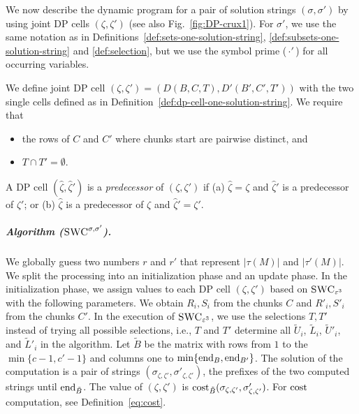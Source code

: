 We now describe the dynamic program for a pair of solution strings $(\sigma, \sigma')$ by using joint DP cells $(\zeta,\zeta')$ (see also Fig.~\ref{fig:DP-crux1}). 
For $\sigma'$, we use the same notation as in Definitions~\ref{def:sets-one-solution-string}, \ref{def:subsets-one-solution-string} and \ref{def:selection}, but we use the symbol prime (\,$\cdot '$\,) for all occurring variables.

\begin{definition}
    We define joint DP cell $(\zeta,\zeta') = (D(B,C,T), D'(B',C',T'))$ with the two single cells defined as in Definition~\ref{def:dp-cell-one-solution-string}. 
    We require that
    \begin{itemize}
        \item the rows of $C$ and $C'$ where chunks start are pairwise distinct, and
        \item $T \cap T' = \emptyset$.
    \end{itemize}
    \label{def:dp-cell-two-solution-string}
\end{definition}
\smallskip


\begin{definition}
    A DP cell $(\hat{\zeta}, \hat{\zeta}')$ is a \emph{predecessor} of $(\zeta, \zeta')$ if (a) $\hat{\zeta} = \zeta$ and $\hat{\zeta}'$ is a predecessor of $\zeta'$; or (b) $\hat{\zeta}$ is a predecessor of $\zeta$ and $\hat{\zeta}' = \zeta'$.
    \label{def:predecessor-two}
\end{definition}

\subparagraph{Algorithm ($\textsc{SWC}^{\sigma, \sigma'}$).}
We globally guess two numbers $r$ and $r'$ that represent $|\tau(M)|$ and $|\tau'(M)|$.
We split the processing into an initialization phase and an update phase.
In the initialization phase, we assign values to each DP cell  $(\zeta,\zeta')$ based on $\textsc{SWC}_{\varepsilon^3}$ with the following parameters.
We obtain $R_i, S_i$ from the chunks $C$ and $R'_i,S'_i$ from the chunks $C'$.
In the execution of $\textsc{SWC}_{\varepsilon^3}$, we use the selections $T,T'$ instead of trying all possible selections, i.e., $T$ and $T'$ determine all $\tilde{U}_i$, $\tilde{L}_i$, $\tilde{U}'_i$, and $\tilde{L}'_i$ in the algorithm.
Let $\tilde{B}$ be the matrix with rows from $1$ to the $\min\{c - 1,c' - 1\}$ and columns one to $\min\{\textrm{end}_B, \textrm{end}_{B'}\}$.
The solution of the computation is a pair of strings $(\sigma_{\zeta,\zeta'},\sigma'_{\zeta,\zeta'})$, the prefixes of the two computed strings until $\textrm{end}_{\tilde{B}}$.
The value of $(\zeta,\zeta')$ is $\mathrm{cost}_{\tilde{B}}(\sigma_{\zeta,\zeta'},\sigma'_{\zeta,\zeta'})$. For $\mathrm{cost}$ computation, see Definition~\ref{eq:cost}.

